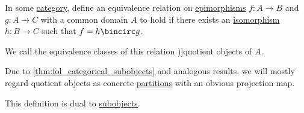 \begin{definition}\label{def:categorical_quotient_object}
  In some \hyperref[def:category]{category}, define an equivalence relation on \hyperref[def:morphism_cancellation/right]{epimorphisms} \( f: A \to B \) and \( g: A \to C \) with a common domain \( A \) to hold if there exists an \hyperref[def:morphism_invertibility/isomorphism]{isomorphism} \( h: B \to C \) such that \( f = h \bincirc g \).

  We call the equivalence classes of this relation \term[ru=факторобъект (\cite[26]{ЦаленкоШульгейфер1974ОсновыТеорииКатегорий})]{quotient objects} of \( A \).
\end{definition}
\begin{comments}
  \item Due to \cref{thm:fol_categorical_subobjects} and analogous results, we will mostly regard quotient objects as concrete \hyperref[def:set_partition]{partitions} with an obvious projection map.

  \item This definition is dual to \hyperref[def:categorical_subobject]{subobjects}.
\end{comments}

